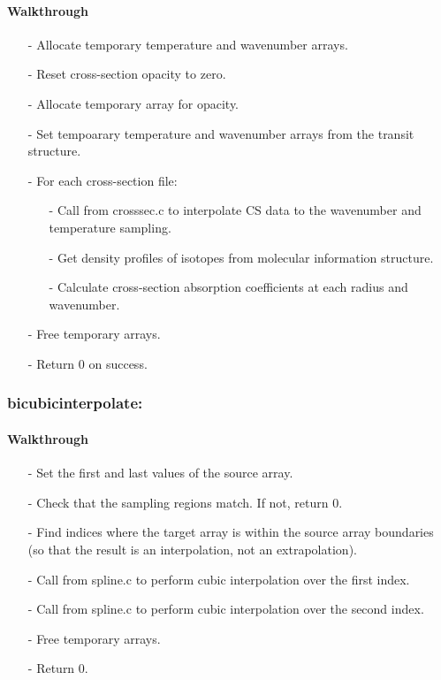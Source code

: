 \documentclass[letterpaper,12pt]{article}
\begin{document}
\paragraph{Walkthrough}
\begin{enumerate}[leftmargin=10pt, noitemsep, parsep=0pt, topsep=0ex]
\item[-] Allocate temporary temperature and wavenumber arrays.
\item[-] Reset cross-section opacity to zero.
\item[-] Allocate temporary array for opacity.
\item[-] Set tempoarary temperature and wavenumber arrays from the transit structure.
\item[-] For each cross-section file:
\begin{enumerate}[leftmargin=10pt, noitemsep, parsep=0pt, topsep=0ex]
\item[-] Call  from crosssec.c to interpolate CS data to the wavenumber and temperature sampling.
\item[-] Get density profiles of isotopes from molecular information structure.
\item[-] Calculate cross-section absorption coefficients at each radius and wavenumber.
\end{enumerate}
\item[-] Free temporary arrays.
\item[-] Return 0 on success. 
\end{enumerate}

\subsubsection{bicubicinterpolate:}
\paragraph{Walkthrough}
\begin{enumerate}[leftmargin=10pt, noitemsep, parsep=0pt, topsep=0ex]
\item[-] Set the first and last values of the source array.
\item[-] Check that the sampling regions match. If not, return 0.
\item[-] Find indices where the target array is within the source array boundaries (so that the result is an interpolation, not an extrapolation).
\item[-] Call  from spline.c to perform cubic interpolation over the first index.
\item[-] Call  from spline.c to perform cubic interpolation over the second index.
\item[-] Free temporary arrays.
\item[-] Return 0.
\end{enumerate}
\end{document}
